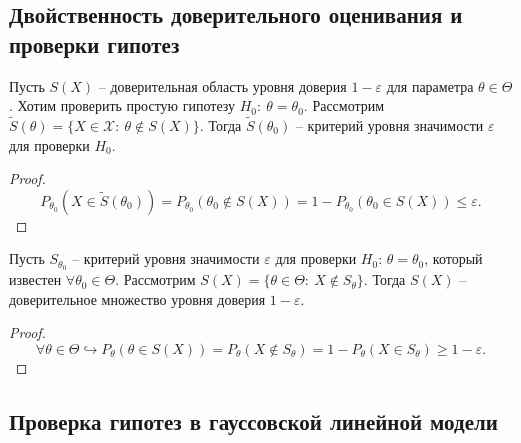 \subsection{Двойственность доверительного оценивания и проверки гипотез}
\begin{proposition}
    Пусть $\displaystyle S( X)$ -- доверительная область уровня доверия $\displaystyle 1-\varepsilon $ для параметра $\displaystyle \theta \in \Theta $. Хотим проверить простую гипотезу $\displaystyle H_{0} :\ \theta =\theta _{0}$. Рассмотрим $\displaystyle \tilde{S}( \theta ) =\{X\in \mathcal{X} :\ \theta \notin S( X)\}$. Тогда $\displaystyle \tilde{S}( \theta _{0})$ -- критерий уровня значимости $\displaystyle \varepsilon $ для проверки $\displaystyle H_{0}$.
\end{proposition}
\begin{proof}
    \begin{equation*}
        P_{\theta _{0}}\left( X\in \tilde{S}( \theta _{0})\right) =P_{\theta _{0}}( \theta _{0} \notin S( X)) =1-P_{\theta _{0}}( \theta _{0} \in S( X)) \leqslant \varepsilon .
    \end{equation*}
\end{proof}
\begin{proposition}
    Пусть $\displaystyle S_{\theta _{0}}$ -- критерий уровня значимости $\displaystyle \varepsilon $ для проверки $\displaystyle H_{0} :\, \theta =\theta _{0}$, который известен $\forall \theta_0 \in \Theta$. Рассмотрим $\displaystyle S( X) =\{\theta \in \Theta :\ X\notin S_{\theta }\}$. Тогда $\displaystyle S( X)$ -- доверительное множество уровня доверия $\displaystyle 1-\varepsilon $.
\end{proposition}
\begin{proof}
    \begin{equation*}
        \forall \theta \in \Theta \hookrightarrow P_{\theta }( \theta \in S( X)) =P_{\theta }( X\notin S_{\theta }) =1-P_{\theta }( X\in S_{\theta }) \geqslant 1-\varepsilon .
    \end{equation*}
\end{proof}
\subsection{Проверка гипотез в гауссовской линейной модели}

